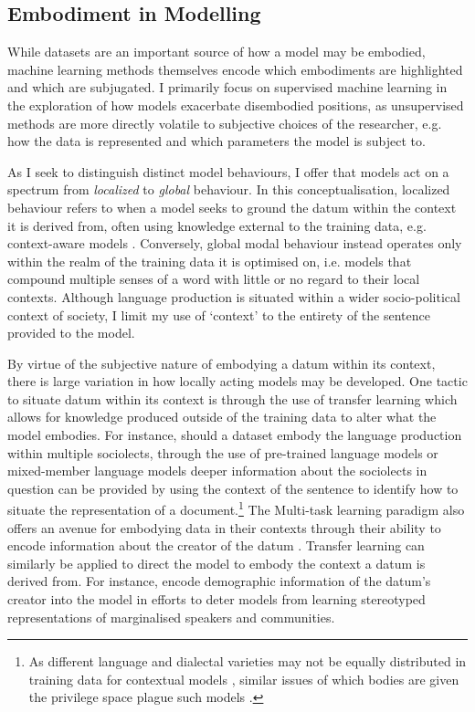 \subsection{Embodiment in Modelling}\label{sec:model_embodiments}
While datasets are an important source of how a model may be embodied, machine learning methods themselves encode which embodiments are highlighted and which are subjugated.
I primarily focus on supervised machine learning in the exploration of how models exacerbate disembodied positions, as unsupervised methods are more directly volatile to subjective choices of the researcher, e.g. how the data is represented and which parameters the model is subject to.

As I seek to distinguish distinct model behaviours, I offer that models act on a spectrum from \textit{localized} to \textit{global} behaviour.
In this conceptualisation, localized behaviour refers to when a model seeks to ground the datum within the context it is derived from, often using knowledge external to the training data, e.g. context-aware models \citep{Garcia:2019,Devlin:2019}.
Conversely, global modal behaviour instead operates only within the realm of the training data it is optimised on, i.e. models that compound multiple senses of a word with little or no regard to their local contexts.
Although language production is situated within a wider socio-political context of society, I limit my use of `context' to the entirety of the sentence provided to the model.

By virtue of the subjective nature of embodying a datum within its context, there is large variation in how locally acting models may be developed.
One tactic to situate datum within its context is through the use of transfer learning which allows for knowledge produced outside of the training data to alter what the model embodies.
For instance, should a dataset embody the language production within multiple sociolects, through the use of pre-trained language models \citep{Devlin:2019} or mixed-member language models \citep{Blodgett:2016} deeper information about the sociolects in question can be provided by using the context of the sentence to identify how to situate the representation of a document.\footnote{As different language and dialectal varieties may not be equally distributed in training data for contextual models \citep{Dunn:2020}, similar issues of which bodies are given the privilege space plague such models \citep{Tan-Celis:2019}.}
The Multi-task learning paradigm also offers an avenue for embodying data in their contexts through their ability to encode information about the creator of the datum \citep{Benton:2017,Garcia:2019}.
Transfer learning can similarly be applied to direct the model to embody the context a datum is derived from.
For instance, \citet{Romanov:2019} encode demographic information of the datum's creator into the model in efforts to deter models from learning stereotyped representations of marginalised speakers and communities.

